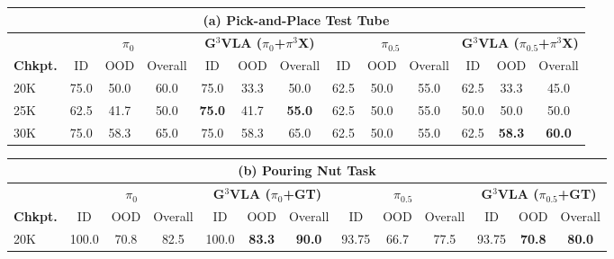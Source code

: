 \documentclass{article}
\begin{document}
\begin{table}[H]
\centering
\small
\setlength{\tabcolsep}{4pt}
\begin{tabular}{l|ccc|ccc|ccc|ccc}
\toprule
\multicolumn{13}{c}{\textbf{(a) Pick-and-Place Test Tube}} \\
\midrule
& \multicolumn{3}{c|}{\textbf{$\pi_0$}}
& \multicolumn{3}{c|}{\textbf{G$^3$VLA ($\pi_{0}$+$\pi^3$X)}}
& \multicolumn{3}{c|}{\textbf{$\pi_{0.5}$}}
& \multicolumn{3}{c}{\textbf{G$^3$VLA ($\pi_{0.5}$+$\pi^3$X)}} \\
\cmidrule(lr){2-4}
\cmidrule(lr){5-7}
\cmidrule(lr){8-10}
\cmidrule(lr){11-13}
\textbf{Chkpt.}
& ID & OOD & Overall
& ID & OOD & Overall
& ID & OOD & Overall
& ID & OOD & Overall \\
\midrule
20K
& 75.0 & 50.0 & 60.0
& 75.0 & 33.3 & 50.0
& 62.5 & 50.0 & 55.0
& 62.5 & 33.3 & 45.0 \\

25K
& 62.5 & 41.7 & 50.0
& \textbf{75.0} & 41.7 & \textbf{55.0}
& 62.5 & 50.0 & 55.0
& 50.0 & 50.0 & 50.0 \\

30K
& 75.0 & 58.3 & 65.0
& 75.0 & 58.3 & 65.0
& 62.5 & 50.0 & 55.0
& 62.5 & \textbf{58.3} & \textbf{60.0} \\
\bottomrule
\end{tabular}


\begin{tabular}{l|ccc|ccc|ccc|ccc}
\multicolumn{13}{c}{\textbf{(b) Pouring Nut Task}} \\
\midrule
& \multicolumn{3}{c|}{\textbf{$\pi_{0}$}}
& \multicolumn{3}{c|}{\textbf{G$^3$VLA ($\pi_{0}$+GT)}}
& \multicolumn{3}{c|}{\textbf{$\pi_{0.5}$}}
& \multicolumn{3}{c}{\textbf{G$^3$VLA ($\pi_{0.5}$+GT)}} \\
\cmidrule(lr){2-4}
\cmidrule(lr){5-7}
\cmidrule(lr){8-10}
\cmidrule(lr){11-13}
\textbf{Chkpt.}
& ID & OOD & Overall
& ID & OOD & Overall
& ID & OOD & Overall
& ID & OOD & Overall \\
\midrule
20K
& 100.0 & 70.8 & 82.5
& 100.0 & \textbf{83.3} & \textbf{90.0}
& 93.75 & 66.7 & 77.5
& 93.75 & \textbf{70.8} & \textbf{80.0} \\


\end{tabular}
\end{table}
\end{document}

